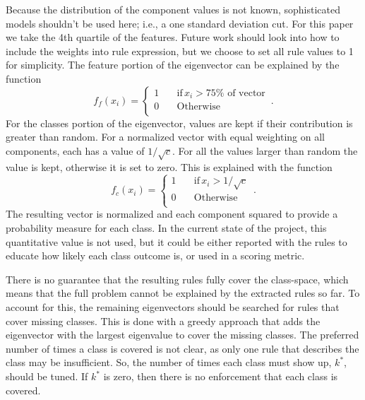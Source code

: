 \documentclass[10pt]{article}
\begin{document}
Because the distribution of the component values is not known, sophisticated models shouldn't be used here; i.e., a one standard deviation cut. For this paper we take the 4th quartile of the features. Future work should look into how to include the weights into rule expression, but we choose to set all rule values to 1 for simplicity. The feature portion of the eigenvector can be explained by the function
\begin{equation}
f_f(x_i)=\begin{cases}
          1 \quad &\text{if} \, x_i > 75\% \text{ of vector} \\
          0 \quad &\text{Otherwise} \\
     \end{cases} \, .
\end{equation}
For the classes portion of the eigenvector, values are kept if their contribution is greater than random. For a normalized vector with equal weighting on all components, each has a value of $1/\sqrt{c}$. For all the values larger than random the value is kept, otherwise it is set to zero. This is explained with the function
\begin{equation}
f_c(x_i)=\begin{cases}
          1 \quad &\text{if} \, x_i > 1/\sqrt{c} \\
          0 \quad &\text{Otherwise} \\
     \end{cases} \, .
\end{equation}
The resulting vector is normalized and each component squared to provide a probability measure for each class. In the current state of the project, this quantitative value is not used, but it could be either reported with the rules to educate how likely each class outcome is, or used in a scoring metric.

There is no guarantee that the resulting rules fully cover the class-space, which means that the full problem cannot be explained by the extracted rules so far. To account for this, the remaining eigenvectors should be searched for rules that cover missing classes. This is done with a greedy approach that adds the eigenvector with the largest eigenvalue to cover the missing classes. The preferred number of times a class is covered is not clear, as only one rule that describes the class may be insufficient. So, the number of times each class must show up, $k^*$, should be tuned. If $k^*$ is zero, then there is no enforcement that each class is covered. 
\end{document}
